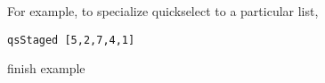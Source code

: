 For example, to specialize quickselect to a particular list, 
\begin{lstlisting}
qsStaged [5,2,7,4,1]
\end{lstlisting}
\TODO finish example


%
%
%
%
%
%
%

